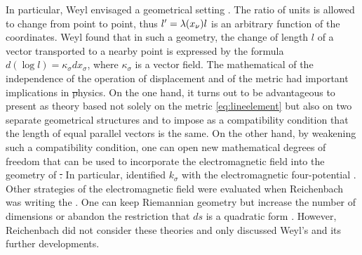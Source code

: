 \documentclass[submitted]{article}
\begin{document}
In particular, Weyl envisaged a geometrical setting  . The ratio of units is allowed to change from point to point, thus $l'=\lambda(x_{\nu})l$ is an arbitrary function of the coordinates. Weyl found that in such a geometry, the change of length $l$ of a vector transported to a nearby point is expressed by the formula $d (\log l)=\kappa_\sigma dx_\sigma$, where $\kappa_\sigma$ is a vector field. The mathematical  of the independence of the operation of displacement and of the metric had important implications in \st physics. On the one hand, it turns out to be advantageous to present \gr as theory based not solely on the metric \cref{eq:lineelement} but also on two separate geometrical structures and to impose as a compatibility condition that the length of equal parallel vectors is the same. On the other hand, by weakening such a compatibility condition, one can open new mathematical degrees of freedom that can be used to incorporate the electromagnetic field into the geometry of \st. In particular, \citet{Weyl1918a} identified $k_\sigma$ with the electromagnetic four-potential . Other strategies of  the electromagnetic field were evaluated when Reichenbach was writing the \Ap. One can keep Riemannian geometry but increase the number of dimensions  or abandon the restriction that $ds$ is a quadratic form \citep{Reichenbaecher1925}. However, Reichenbach did not consider these theories and only discussed Weyl's  and its further developments.
\end{document}

